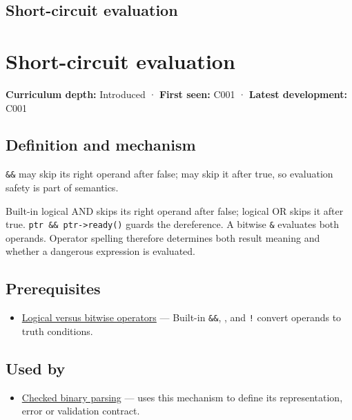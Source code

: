 \hypertarget{appendix-2e245a6fa8d3}{}
\section*{Short-circuit evaluation}
\chapter{Short-circuit evaluation}\label{appendix-2e245a6fa8d3-short-circuit-evaluation}

\textbf{Curriculum depth:} Introduced · \textbf{First seen:} C001 · \textbf{Latest development:} C001

\section{Definition and mechanism}\label{appendix-2e245a6fa8d3-definition-and-mechanism}

\texttt{\&\&} may skip its right operand after false; \texttt{\textbar{}\textbar{}} may skip it after true, so evaluation safety is part of semantics.

Built-in logical AND skips its right operand after false; logical OR skips it after true. \texttt{ptr\ \&\&\ ptr-\textgreater{}ready()} guards the dereference. A bitwise \texttt{\&} evaluates both operands. Operator spelling therefore determines both result meaning and whether a dangerous expression is evaluated.

\section{Prerequisites}\label{appendix-2e245a6fa8d3-prerequisites}

\begin{itemize}
\tightlist
\item
  \hyperref[appendix-fe6b457d68d8]{Logical versus bitwise operators} --- Built-in \texttt{\&\&}, \texttt{\textbar{}\textbar{}}, and \texttt{!} convert operands to truth conditions.
\end{itemize}

\section{Used by}\label{appendix-2e245a6fa8d3-used-by}

\begin{itemize}
\tightlist
\item
  \hyperref[appendix-652d81568de9]{Checked binary parsing} --- uses this mechanism to define its representation, error or validation contract.
\end{itemize}

